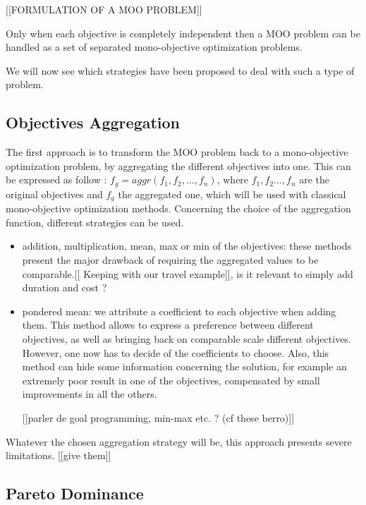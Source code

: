 [[FORMULATION OF A MOO PROBLEM]]

Only when each objective is completely independent then a MOO problem can be handled as a set of separated mono-objective optimization problems.

We will now see which strategies have been proposed to deal with such a type of problem.

\subsection{Objectives Aggregation}

The first approach is to transform the MOO problem back to a mono-objective optimization problem, by aggregating the different objectives into one. This can be expressed as follow : \(f_g = aggr(f_1,f_2,...,f_n)\), where \(f_1, f_2...,f_n\) are the original objectives and \(f_g\) the aggregated one, which will be used with classical mono-objective optimization methods. 
Concerning the choice of the aggregation function, different strategies can be used.

\begin{itemize}

\item addition, multiplication, mean, max or min of the objectives: these methods present  the major drawback of requiring the aggregated values to be comparable.[[ Keeping with our travel example]], is it relevant to simply add duration and cost ?

\item pondered mean: we attribute a coefficient to each objective when adding them. This method allows to express a preference between different objectives, as well as bringing back on comparable scale different objectives. However, one now has to decide of the coefficients to choose. Also, this method can hide some information concerning the solution, for example an extremely poor result in one of the objectives, compensated by small improvements in all the others.

[[parler de goal programming, min-max etc. ? (cf these berro)]]

\end{itemize}

Whatever the chosen aggregation strategy will be, this approach presents severe limitations.  [[give them]]

\subsection{Pareto Dominance}

